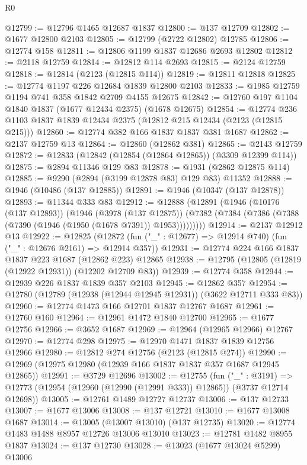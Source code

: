 \begin{lexlean}{R0}
\begin{coremodule}
@12799 := @12796 @1465 @12687 @1837
@12800 := @137 @12709
@12802 := @1677 @12800 @2103
@12805 := @12799 (@2722 @12802) @12785
@12806 := @12774 @158
@12811 := @12806 @1199 @1837 @12686 @2693 @12802
@12812 := @2118 @12759
@12814 := @12812 @114 @2693
@12815 := @2124 @12759
@12818 := @12814 (@2123 (@12815 @114))
@12819 := @12811 @12818
@12825 := @12774 @1197 @226 @12684 @1839 @12800 @2103
@12833 := @1985 @12759 @1194 @741 @358 @1842 @2709 @4155 @12675
@12842 := @12760 @197 @1104 @1840 @1837 (@1677 @12434 @2375) (@1678 @12675)
@12854 := @12774 @236 @1103 @1837 @1839 @12434 @2375 (@12812 @215 @12434 (@2123 (@12815 @215)))
@12860 := @12774 @382 @166 @1837 @1837 @381 @1687
@12862 := @2137 @12759 @13
@12864 := @12860 (@12862 @381)
@12865 := @2143 @12759
@12872 := @12833 (@12842 (@12854 (@12864 @12865)) (@3309 @12399 @114))
@12875 := @2894 @11346 @129 @83
@12878 := @1931 (@2862 @12875 @114)
@12885 := @9290 (@2894 (@3199 @12878 @83) @129 @83) @11352
@12888 := @1946 (@10486 (@137 @12885))
@12891 := @1946 (@10347 (@137 @12878))
@12893 := @11344 @333 @83
@12912 := @12888
    (@12891
      (@1946
        (@10176 (@137 @12893))
        (@1946
          (@3978 (@137 @12875))
          (@7382 (@7384 (@7386 (@7388 (@7390 (@1946 (@1950 (@1678 @7391)) @1953)))))))))
@12914 := @2137 @12912 @13
@12922 := @12825
    (@12872 (fun ("_" : @12677) => @12914 @740) (fun ("_" : @12676 @2161) => @12914 @357))
@12931 := @12774 @224 @166 @1837 @1837 @223 @1687 (@12862 @223) @12865
@12938 := @12795 (@12805 (@12819 (@12922 @12931)) (@12202 @12709 @83))
@12939 := @12774 @358
@12944 := @12939 @226 @1837 @1839 @357 @2103
@12945 := @12862 @357
@12954 := @12780 (@12789 (@12938 (@12944 @12945 @12931)) (@3622 @12711 @333 @83))
@12960 := @12774 @1473 @166 @12701 @1837 @12767 @1687
@12961 := @12760 @160
@12964 := @12961 @1472 @1840 @12700
@12965 := @1677 @12756
@12966 := @3652 @1687
@12969 := @12964 (@12965 @12966) @12767
@12970 := @12774 @298
@12975 := @12970 @1471 @1837 @1839 @12756 @12966
@12980 := @12812 @274 @12756 (@2123 (@12815 @274))
@12990 := @12969 (@12975 @12980 (@12939 @166 @1837 @1837 @357 @1687 @12945 @12865))
@12991 := @3729 @12696
@13002 := @12755
    (fun ("_" : @3191) =>
    @12773 (@12954 (@12960 (@12990 (@12991 @333)) @12865)) (@3737 @12714 @12698))
@13005 := @12761 @1489 @12727 @12737
@13006 := @137 @12733
@13007 := @1677 @13006
@13008 := @137 @12721
@13010 := @1677 @13008 @1687
@13014 := @13005 (@13007 @13010) (@137 @12735)
@13020 := @12774 @1483 @1488 @8957 @12726 @13006 @13010
@13023 := @12781 @1482 @8955 @1837
@13024 := @137 @12730
@13028 := @13023 (@1677 @13024 @5299) @13006

\end{coremodule}
\end{lexlean}
